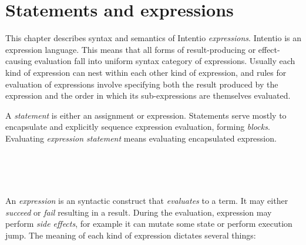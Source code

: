 \chapter{Statements and expressions}

This chapter describes syntax and semantics of Intentio \emph{expressions}. Intentio is an expression language. This means that all forms of result-producing or effect-causing evaluation fall into uniform syntax category of expressions. Usually each kind of expression can nest within each other kind of expression, and rules for evaluation of expressions involve specifying both the result produced by the expression and the order in which its sub-expressions are themselves evaluated.

A \emph{statement} is either an assignment or expression. Statements serve mostly to encapsulate and explicitly sequence expression evaluation, forming \emph{blocks}. Evaluating \emph{expression statement} means evaluating encapsulated expression.

\begin{bnf}
   \eq    {}  
            \gorln {}     \\
  \\
   \eq    {}                      
            \gorln {}                 
            \gorln {}                   
            \gorln {}                    
            \gorln {}                   
            \gorln \term{(} \  \ \term{)}  
            \gorln {}                    
            \gorln {}                   
            \gorln {}                      
            \gorln {}                  
\end{bnf}

An \emph{expression} is an syntactic construct that \emph{evaluates} to a term. It may either \emph{succeed} or \emph{fail} resulting in a result. During the evaluation, expression may perform \emph{side effects}, for example it can mutate some state or perform execution jump. The meaning of each kind of expression dictates several things:

